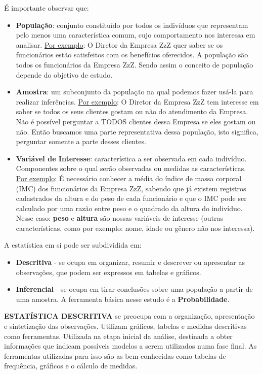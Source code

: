 \documentclass[a4paper,11pt]{article}
\begin{document}
É importante observar que: \vspace{-1em}
\begin{itemize}
	\item \textbf{População}: conjunto constituído por todos os indivíduos que representam pelo menos uma característica comum, cujo comportamento nos interessa em analisar. \underline{Por exemplo}: O Diretor da Empresa ZzZ quer saber se os funcionários estão satisfeitos com os benefícios oferecidos. A população são todos os funcionários da Empresa ZzZ. Sendo assim o conceito de população depende do objetivo de estudo.
	\item \textbf{Amostra}: um subconjunto da população na qual podemos fazer usá-la para realizar inferências. \underline{Por exemplo}: O Diretor da Empresa ZzZ tem interesse em saber se todos os seus clientes gostam ou não do atendimento da Empresa. Não é possível perguntar a TODOS clientes dessa Empresa se eles gostam ou não. Então buscamos uma parte representativa dessa população, isto significa, perguntar somente a parte desses clientes.
	\item \textbf{Variável de Interesse}: característica a ser observada em cada indivíduo. Componentes sobre o qual serão observadas ou medidas as características. \underline{Por exemplo}: É necessário conhecer a média do índice de massa corporal (IMC) dos funcionários da Empresa ZzZ, sabendo que já existem registros cadastrados da altura e do peso de cada funcionário e que o IMC pode ser calculado por uma razão entre peso e o quadrado da altura do indivíduo. Nesse caso: \textbf{peso} e \textbf{altura} são nossas variáveis de interesse (outras características, como por exemplo: nome, idade ou gênero não nos interessa).
\end{itemize}

A estatística em si pode ser subdividida em: \vspace{-1em}
\begin{itemize}
	\item \textbf{Descritiva} - se ocupa em organizar, resumir e descrever ou apresentar as observações, que podem ser expressos em tabelas e gráficos.
	\item \textbf{Inferencial} - se ocupa em tirar conclusões sobre uma população a partir de uma amostra. A ferramenta básica nesse estudo é a \textbf{Probabilidade}.
\end{itemize}

\textbf{ESTATÍSTICA DESCRITIVA} se preocupa com a organização, apresentação e sintetização das observações. Utilizam gráficos, tabelas e medidas descritivas como ferramentas. Utilizada na etapa inicial da análise, destinada a obter informações que indicam possíveis modelos a serem utilizados numa fase final. As ferramentas utilizadas para isso são as bem conhecidas como tabelas de frequência, gráficos e o cálculo de medidas.
\end{document}
